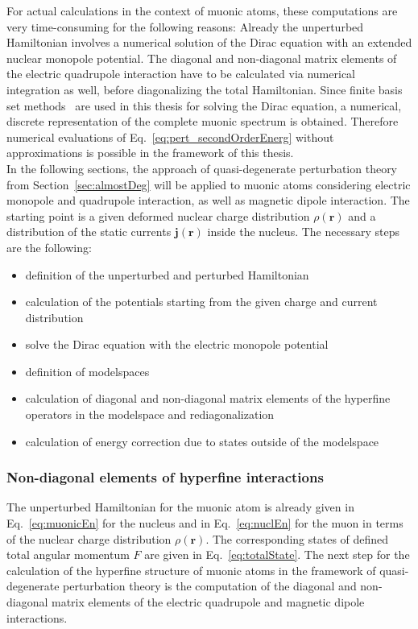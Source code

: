 For actual calculations in the context of muonic atoms, these computations are very time-consuming for the following reasons: Already the unperturbed Hamiltonian involves a numerical solution of the Dirac equation with an extended nuclear monopole potential. The diagonal and non-diagonal matrix elements of the electric quadrupole interaction have to be calculated via numerical integration as well, before diagonalizing the total Hamiltonian. Since finite basis set methods~\cite{Shabaev2004} are used in this thesis for solving the Dirac equation, a numerical, discrete representation of the complete muonic spectrum is obtained. Therefore numerical evaluations of Eq.~\eqref{eq:pert_secondOrderEnerg} without approximations is possible in the framework of this thesis.\\

In the following sections, the approach of quasi-degenerate perturbation theory from Section~\ref{sec:almostDeg} will be applied to muonic atoms considering electric monopole and quadrupole interaction, as well as magnetic dipole interaction. The starting point is a given deformed nuclear charge distribution $\rho(\mathbf{r})$ and a distribution of the static currents $\mathbf{j}(\mathbf{r})$ inside the nucleus.
The necessary steps are the following:
\begin{itemize}
\item definition of the unperturbed  and perturbed Hamiltonian
\item calculation of the potentials starting from the given charge and current distribution
\item solve the Dirac equation with the electric monopole potential
\item definition of modelspaces
\item calculation of diagonal and non-diagonal matrix elements of the hyperfine operators in the modelspace and rediagonalization
\item calculation of energy correction due to states outside of the modelspace
\end{itemize}


\subsubsection{Non-diagonal elements of hyperfine interactions}
\label{sec:non-diagElements}
The unperturbed Hamiltonian for the muonic atom is already given in Eq.~\eqref{eq:muonicEn} for the nucleus and in Eq.~\eqref{eq:nuclEn} for the muon in terms of the nuclear charge distribution $\rho(\mathbf{r})$. The corresponding states of defined total angular momentum $F$ are given in Eq.~\eqref{eq:totalState}.
The next step for the calculation of the hyperfine structure of muonic atoms in the framework of quasi-degenerate perturbation theory is the computation of the diagonal and non-diagonal matrix elements of the electric quadrupole and magnetic dipole interactions.

